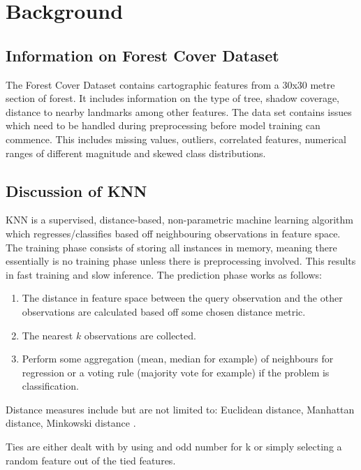 \documentclass[conference]{IEEEtran}
\begin{document}
\section{Background}

\subsection{Information on Forest Cover Dataset}

The Forest Cover Dataset contains cartographic features from a 30x30 metre section of forest. It includes information on the type of tree, shadow coverage, distance to nearby landmarks among other features. The data set contains issues which need to be handled during preprocessing before model training can commence. This includes missing values, outliers, correlated features, numerical ranges of different magnitude and skewed class distributions.

\subsection{Discussion of KNN}

KNN is a supervised, distance-based, non-parametric machine learning algorithm which regresses/classifies based off neighbouring observations in feature space. The training phase consists of storing all instances in memory\cite[p.~187]{fundamentals}, meaning there essentially is no training phase unless there is preprocessing involved. This results in fast training and slow inference. The prediction phase works as follows: 

\begin{enumerate}
	\item The distance in feature space between the query observation and the other observations are calculated based off some chosen distance metric.
	\item The nearest $k$ observations are collected.
	\item Perform some aggregation (mean, median for example) of neighbours for regression or a voting rule (majority vote \cite[p.~192]{fundamentals} for example) if the problem is classification.
\end{enumerate}

Distance measures include but are not limited to: Euclidean distance, Manhattan distance, Minkowski distance \cite[p.~11]{similarity}.

Ties are either dealt with by using and odd number for k or simply selecting a random feature out of the tied features\cite[p.~7]{similarity}.
\end{document}
